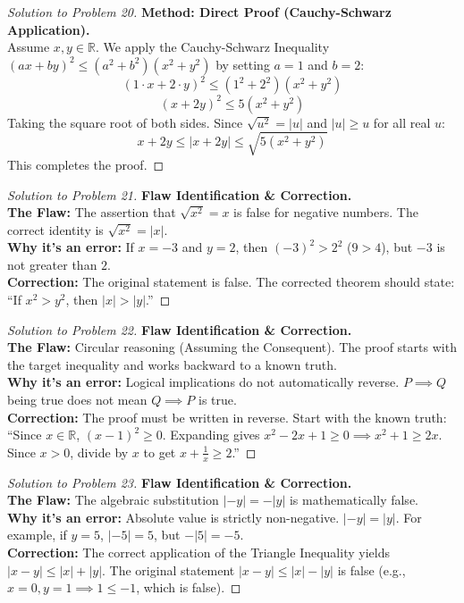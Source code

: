 \documentclass[11pt]{article}
\begin{document}
\begin{proof}[Solution to Problem 20]
    \textbf{Method: Direct Proof (Cauchy-Schwarz Application).} \\
    Assume $x, y \in \mathbb{R}$. We apply the Cauchy-Schwarz Inequality $(ax + by)^2 \le (a^2 + b^2)(x^2 + y^2)$ by setting $a = 1$ and $b = 2$:
    \[ (1 \cdot x + 2 \cdot y)^2 \le (1^2 + 2^2)(x^2 + y^2) \]
    \[ (x + 2y)^2 \le 5(x^2 + y^2) \]
    Taking the square root of both sides. Since $\sqrt{u^2} = |u|$ and $|u| \ge u$ for all real $u$:
    \[ x + 2y \le |x + 2y| \le \sqrt{5(x^2 + y^2)} \]
    This completes the proof.
\end{proof}

\begin{proof}[Solution to Problem 21]
    \textbf{Flaw Identification \& Correction.} \\
    \textbf{The Flaw:} The assertion that $\sqrt{x^2} = x$ is false for negative numbers. The correct identity is $\sqrt{x^2} = |x|$. \\
    \textbf{Why it's an error:} If $x = -3$ and $y = 2$, then $(-3)^2 > 2^2$ ($9 > 4$), but $-3$ is not greater than $2$. \\
    \textbf{Correction:} The original statement is false. The corrected theorem should state: ``If $x^2 > y^2$, then $|x| > |y|$.''
\end{proof}

\begin{proof}[Solution to Problem 22]
    \textbf{Flaw Identification \& Correction.} \\
    \textbf{The Flaw:} Circular reasoning (Assuming the Consequent). The proof starts with the target inequality and works backward to a known truth. \\
    \textbf{Why it's an error:} Logical implications do not automatically reverse. $P \implies Q$ being true does not mean $Q \implies P$ is true. \\
    \textbf{Correction:} The proof must be written in reverse. Start with the known truth: ``Since $x \in \mathbb{R}$, $(x - 1)^2 \ge 0$. Expanding gives $x^2 - 2x + 1 \ge 0 \implies x^2 + 1 \ge 2x$. Since $x > 0$, divide by $x$ to get $x + \frac{1}{x} \ge 2$.''
\end{proof}

\begin{proof}[Solution to Problem 23]
    \textbf{Flaw Identification \& Correction.} \\
    \textbf{The Flaw:} The algebraic substitution $|-y| = -|y|$ is mathematically false. \\
    \textbf{Why it's an error:} Absolute value is strictly non-negative. $|-y| = |y|$. For example, if $y = 5$, $|-5| = 5$, but $-|5| = -5$. \\
    \textbf{Correction:} The correct application of the Triangle Inequality yields $|x - y| \le |x| + |y|$. The original statement $|x - y| \le |x| - |y|$ is false (e.g., $x=0, y=1 \implies 1 \le -1$, which is false).
\end{proof}
\end{document}
